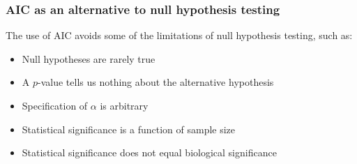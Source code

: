 \documentclass[color=usenames,dvipsnames]{beamer}\usepackage[]{graphicx}\usepackage[]{color}
\begin{document}
\begin{frame}
  \frametitle{\normalsize AIC as an alternative to null hypothesis testing} %
  The use of AIC avoids some of the limitations of null hypothesis
  testing, such as: \\
  \begin{itemize}
    \item Null hypotheses are rarely true %
    \item A $p$-value tells us nothing about the alternative hypothesis %
    \item Specification of $\alpha$ is arbitrary %
    \item Statistical significance is a function of sample size %
    \item Statistical significance does not equal biological significance
  \end{itemize}
\end{frame}

















\end{document}
